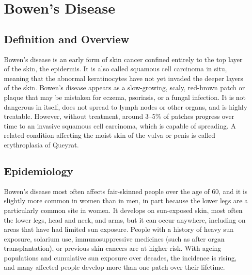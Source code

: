 \chapter{Bowen's Disease}

\section*{Definition and Overview}
Bowen's disease is an early form of skin cancer confined entirely to the top layer of the skin, the epidermis. It is also called squamous cell carcinoma in situ, meaning that the abnormal keratinocytes have not yet invaded the deeper layers of the skin. Bowen's disease appears as a slow-growing, scaly, red-brown patch or plaque that may be mistaken for eczema, psoriasis, or a fungal infection. It is not dangerous in itself, does not spread to lymph nodes or other organs, and is highly treatable. However, without treatment, around 3--5\% of patches progress over time to an invasive squamous cell carcinoma, which is capable of spreading. A related condition affecting the moist skin of the vulva or penis is called erythroplasia of Queyrat.

\section*{Epidemiology}
Bowen's disease most often affects fair-skinned people over the age of 60, and it is slightly more common in women than in men, in part because the lower legs are a particularly common site in women. It develops on sun-exposed skin, most often the lower legs, head and neck, and arms, but it can occur anywhere, including on areas that have had limited sun exposure. People with a history of heavy sun exposure, solarium use, immunosuppressive medicines (such as after organ transplantation), or previous skin cancers are at higher risk. With ageing populations and cumulative sun exposure over decades, the incidence is rising, and many affected people develop more than one patch over their lifetime.

